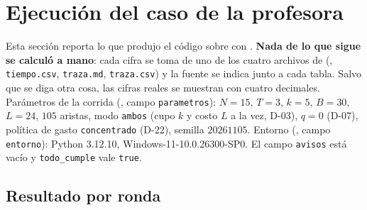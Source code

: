 \section{Ejecución del caso de la profesora}\label{sec:caso}

Esta sección reporta lo que produjo el código sobre  con
. \textbf{Nada de lo que sigue se calculó a mano}: cada cifra se toma de uno de los cuatro archivos de
 (, \texttt{tiempo.csv}, \texttt{traza.md}, \texttt{traza.csv}) y la fuente se indica
junto a cada tabla. Salvo que se diga otra cosa, las cifras reales se muestran con cuatro decimales. Parámetros de la corrida
(, campo \texttt{parametros}): $N=15$, $T=3$, $k=5$, $B=30$, $L=24$, $105$ aristas, modo \texttt{ambos}
(cupo $k$ y costo $L$ a la vez, D-03), $q=0$ (D-07), política de gasto \texttt{concentrado} (D-22), semilla $20261105$. Entorno
(, campo \texttt{entorno}): Python 3.12.10, Windows-11-10.0.26300-SP0. El campo \texttt{avisos} está vacío y
\texttt{todo\_cumple} vale \texttt{true}.

\subsection{Resultado por ronda}

\begin{table}[h]
\centering
\small
\setlength{\tabcolsep}{4pt}
\caption{Resultado por ronda. Reparto y topes en el orden N09/N11/N13/N14/N15; la fila Totales es $\sum_t f(S_t)$ y $\sum_t\sum_i u_i(x_i)$. Origen: \texttt{resultado.json}, campos \texttt{rondas[].seleccion}, \texttt{f}, \texttt{costo\_participacion}, \texttt{reparto}, \texttt{topes\_efectivos}, \texttt{utilidad} y \texttt{totales.suma\_f}, \texttt{totales.suma\_utilidad}.}\label{tab:rondas}
\end{table}

